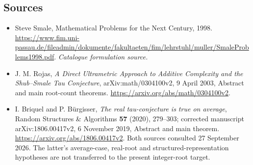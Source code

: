 \documentclass[11pt,a4paper]{article}
\numberwithin{equation}{section}
\begin{document}
\subsection{Sources}
\begin{itemize}\raggedright
\item[\textnormal{[S1]}]\hypertarget{source:224:1}{} Steve Smale, Mathematical Problems for the Next Century, 1998.
\url{https://www.fim.uni-passau.de/fileadmin/dokumente/fakultaeten/fim/lehrstuhl/muller/SmaleProblems1998.pdf}.
{\small\textit{Catalogue formulation source.}}
\item[\textnormal{[E1]}]\hypertarget{extra:224:1}{}
J. M. Rojas, \emph{A Direct Ultrametric Approach to Additive Complexity
and the Shub--Smale Tau Conjecture}, arXiv:math/0304100v2, 9 April 2003,
Abstract and main root-count theorems.
\url{https://arxiv.org/abs/math/0304100v2}.
\item[\textnormal{[E2]}]\hypertarget{extra:224:2}{}
I. Briquel and P. B\"urgisser, \emph{The real tau-conjecture is true on
average}, Random Structures \& Algorithms \textbf{57} (2020), 279--303;
corrected manuscript arXiv:1806.00417v2, 6 November 2019, Abstract and
main theorem. \url{https://arxiv.org/abs/1806.00417v2}.
Both sources consulted 27 September 2026. The latter's average-case,
real-root and structured-representation hypotheses are not transferred
to the present integer-root target.
\end{itemize}
\end{document}
